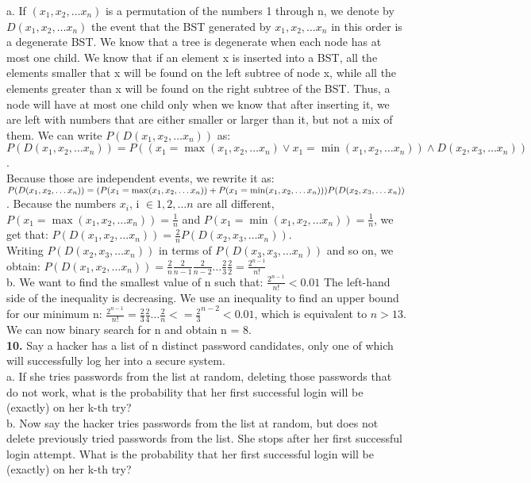 \documentclass[10pt,a4paper,oneside,draft]{report}
\begin{document}
a. If $(x_1, x_2, \dots x_n)$ is a permutation of the numbers 1 through n, we denote by $D(x_1, x_2, \dots x_n)$ the event that the BST generated by $x_1, x_2, \dots x_n$ in this order is a degenerate BST. We know that a tree is degenerate when each node has at most one child. We know that if an element x is inserted into a BST, all the elements smaller that x will be found on the left subtree of node x, while all the elements greater than x will be found on the right subtree of the BST. Thus, a node will have at most one child only when we know that after inserting it, we are left with numbers that are either smaller or larger than it, but not a mix of them. We can write $P(D(x_1, x_2, \dots x_n))$ as: $ P(D(x_1, x_2, \dots x_n)) = 
P((x_1=\max(x_1, x_2, \dots x_n) \lor x_1=\min(x_1, x_2, \dots x_n)) \land D(x_2, x_3, \dots x_n))$. \\
Because those are independent events, we rewrite it as: 
$P(D(x_1, x_2, \dots x_n)) = \\
(P(x_1=\max(x_1, x_2, \dots x_n)) + P(x_1=\min(x_1, x_2, \dots x_n))) P( D(x_2, x_3, \dots x_n))$. Because the numbers $x_i$, i $\in {1, 2, \dots n}$ are all different, \\
$P(x_1=\max(x_1, x_2, \dots x_n)) = \frac{1}{n}$ and $P(x_1=\min(x_1, x_2, \dots x_n)) = \frac{1}{n} $, we get that: $P(D(x_1, x_2, \dots x_n)) = \frac{2}{n} P( D(x_2, x_3, \dots x_n))$. \\
Writing $P( D(x_2, x_3, \dots x_n))$ in terms of $P( D(x_3, x_3, \dots x_n))$ and so on, we obtain:
$P(D(x_1, x_2, \dots x_n)) = \frac{2}{n} \frac{2}{n-1} \frac{2}{n-2} \dots \frac{2}{3} \frac{2}{2} = \frac{2 ^ {n - 1}}{n!}$ \\

b. We want to find the smallest value of n such that:
$\frac{2 ^ {n - 1}}{n!} < 0.01$ The left-hand side of the inequality is decreasing. We use an inequality to find an upper bound for our minimum n:
$\frac{2 ^ {n - 1}}{n!} = \frac{2}{3} \frac{2}{4} \dots \frac{2}{n} <= \frac{2}{3} ^ {n-2} < 0.01 $, which is equivalent to $n > 13$. We can now binary search for n and obtain n = 8. \\

\textbf{10.} Say a hacker has a list of n distinct password candidates, only one of which will successfully log her into a secure system. \\
a. If she tries passwords from the list at random, deleting those passwords that do not work, what is the probability that her first successful login will be (exactly) on her k-th try? \\
b. Now say the hacker tries passwords from the list at random, but does not delete previously tried passwords from the list. She stops after her first successful login attempt. What is the probability that her first successful login will be (exactly) on her k-th try? \\
\end{document}

